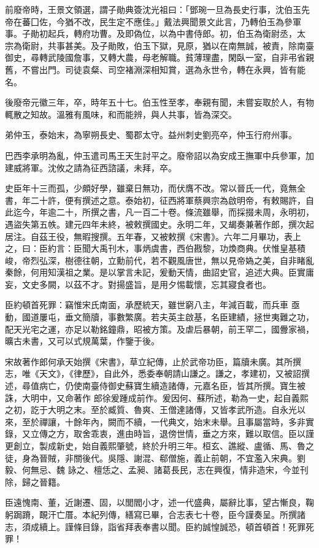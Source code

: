 \begin{pinyinscope}
 前廢帝時，王景文領選，謂子勛典簽沈光祖曰：「鄧琬一旦為長史行事，沈伯玉先帝在蕃囗佐，今猶不改，民生定不應佳。」戴法興聞景文此言，乃轉伯玉為參軍事。子勛初起兵，轉府功曹。及即偽位，以為中書侍郎。初，伯玉為衛尉丞，太
 宗為衛尉，共事甚美。及子勛敗，伯玉下獄，見原，猶以在南無誠，被責，除南臺御史，尋轉武陵國詹事，又轉大農，母老解職。貧薄理盡，閑臥一室，自非弔省親舊，不嘗出門。司徒袁粲、司空褚淵深相知賞，選為永世令，轉在永興，皆有能名。



 後廢帝元徽三年，卒，時年五十七。伯玉性至孝，奉親有聞，未嘗妄取於人，有物輒散之知故。溫雅有風味，和而能辨，與人共事，皆為深交。



 弟仲玉，泰始末，為寧朔長史、蜀郡太守。益州刺史劉亮卒，仲玉行府州事。



 巴西李承明為亂，仲玉遣司馬王天生討平之。廢帝詔以為安成王撫軍中兵參軍，加建威將軍。沈攸之請為征西諮議，未拜，卒。



 史臣年十三而孤，少頗好學，雖棄日無功，而伏膺不改。常以晉氏一代，竟無全書，年二十許，便有撰述之意。泰始初，征西將軍蔡興宗為啟明帝，有敕賜許，自此迄今，年逾二十，所撰之書，凡一百二十卷。條流雖舉，而採掇未周，永明初，遇盜失第五帙。建元四年未終，被敕撰國史。永明二年，又朅奏兼著作郎，撰次起
 居注。自茲王役，無暇搜撰。五年春，又被敕撰《宋書》。六年二月畢功，表上之，曰：臣約言：臣聞大禹刊木，事炳虞書，西伯戡黎，功煥商典。伏惟皇基積峻，帝烈弘深，樹德往朝，立勳前代，若不觀風唐世，無以見帝媯之美，自非睹亂秦餘，何用知漢祖之業。是以掌言未記，爰動天情，曲詔史官，追述大典。臣實庸妄，文史多闕，以茲不才。對揚盛旨，是用夕惕載懷，忘其寢食者也。



 臣約頓首死罪：竊惟宋氏南面，承歷統天，雖世窮八主，年減百載，而兵車
 亟動，國道屢屯，垂文簡牘，事數繁廣。若夫英主啟基，名臣建績，拯世夷難之功，配天光宅之運，亦足以勒銘鐘鼎，昭被方策。及虐后暴朝，前王罕二，國釁家禍，曠古未書，又可以式規萬葉，作鑒于後。



 宋故著作郎何承天始撰《宋書》，草立紀傳，止於武帝功臣，篇牘未廣。其所撰志，唯《天文》，《律歷》，自此外，悉委奉朝請山謙之。謙之，孝建初，又被詔撰述，尋值病亡，仍使南臺侍御史蘇寶生續造諸傳，元嘉名臣，皆其所撰。寶生被誅，大明中，又命著作
 郎徐爰踵成前作。爰因何、蘇所述，勒為一史，起自義熙之初，訖于大明之末。至於臧質、魯爽、王僧達諸傳，又皆孝武所造。自永光以來，至於禪讓，十餘年內，闕而不續，一代典文，始末未舉。且事屬當時，多非實錄，又立傳之方，取舍乖衷，進由時旨，退傍世情，垂之方來，難以取信。臣以謹更創立，製成新史，始自義熙肇號，終於升明三年。桓玄、譙縱、盧循、馬、魯之徒，身為晉賊，非關後代。吳隱、謝混、郗僧施，義止前朝，不宜濫入宋典。劉毅、何無忌、魏
 詠之、檀恁之、孟昶、諸葛長民，志在興復，情非造宋，今並刊除，歸之晉籍。



 臣遠愧南、董，近謝遷、固，以閭閻小才，述一代盛典，屬辭比事，望古慚良，鞠躬跼蹐，靦汗亡厝。本紀列傳，繕寫已畢，合志表七十卷，臣今謹奏呈。所撰諸志，須成續上。謹條目錄，詣省拜表奉書以聞。臣約誠惶誠恐，頓首頓首！死罪死罪！



\end{pinyinscope}